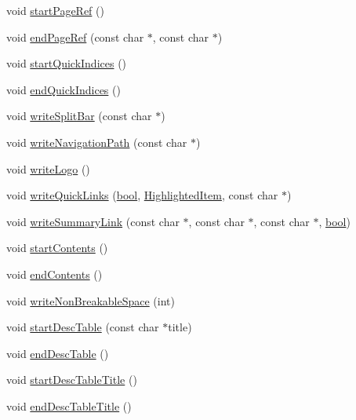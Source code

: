 \begin{DoxyCompactItemize}
\item 
void \hyperlink{class_latex_generator_a06e41ed1bb67b71516bed656ea2f2243}{start\+Page\+Ref} ()
\item 
void \hyperlink{class_latex_generator_ad2f1a929d3e6a97c1e521184f03961c9}{end\+Page\+Ref} (const char $\ast$, const char $\ast$)
\item 
void \hyperlink{class_latex_generator_a3fe16e2419736f6bdaffa0652997d0ef}{start\+Quick\+Indices} ()
\item 
void \hyperlink{class_latex_generator_a8a107eb66c8340cc33fdfde6dac04861}{end\+Quick\+Indices} ()
\item 
void \hyperlink{class_latex_generator_a03cf7304fa966648d6b43b16b9d71c47}{write\+Split\+Bar} (const char $\ast$)
\item 
void \hyperlink{class_latex_generator_a166d8ecd50b8a231cf90896faf6ee337}{write\+Navigation\+Path} (const char $\ast$)
\item 
void \hyperlink{class_latex_generator_a82e0611e3440955d89a6978936d22cec}{write\+Logo} ()
\item 
void \hyperlink{class_latex_generator_acd7e692f462fed94bbe820d5bb4c82a0}{write\+Quick\+Links} (\hyperlink{qglobal_8h_a1062901a7428fdd9c7f180f5e01ea056}{bool}, \hyperlink{index_8h_a6643b7765422a7eb577f0b2ed8fb2e09}{Highlighted\+Item}, const char $\ast$)
\item 
void \hyperlink{class_latex_generator_a95e5d18bdec50446a0ba6f4b8c894ec3}{write\+Summary\+Link} (const char $\ast$, const char $\ast$, const char $\ast$, \hyperlink{qglobal_8h_a1062901a7428fdd9c7f180f5e01ea056}{bool})
\item 
void \hyperlink{class_latex_generator_a226b22a047a903fed1b3d30dad5e41ac}{start\+Contents} ()
\item 
void \hyperlink{class_latex_generator_aac3b9ac454e3d4ba7d4de3bb9a1c4c6b}{end\+Contents} ()
\item 
void \hyperlink{class_latex_generator_a5e671bec2d4436bc8dd7577ac925eaac}{write\+Non\+Breakable\+Space} (int)
\item 
void \hyperlink{class_latex_generator_a6cedf5f253f92b21a660f5014988866a}{start\+Desc\+Table} (const char $\ast$title)
\item 
void \hyperlink{class_latex_generator_a93e92fa0f35e8f3da32b0f08597a0285}{end\+Desc\+Table} ()
\item 
void \hyperlink{class_latex_generator_a229466fe4c9fa9251c0bfb514600feaf}{start\+Desc\+Table\+Title} ()
\item 
void \hyperlink{class_latex_generator_a3481549b50ac3745a5de40a590bf1fb5}{end\+Desc\+Table\+Title} ()

\end{DoxyCompactItemize}

